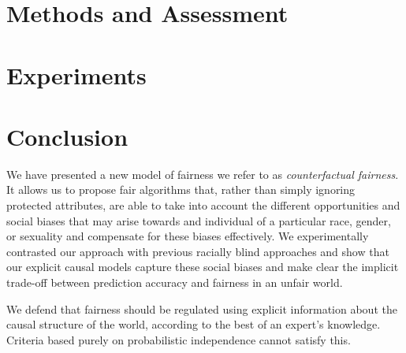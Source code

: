 \documentclass{article}
\begin{document}
\section{Methods and Assessment}
\label{sec:methods}


\section{Experiments}
\label{sec:experiments}


\section{Conclusion}
\label{sec:conclusion}
We have presented a new model of fairness we refer to as {\em
  counterfactual fairness}. It allows us to propose fair
algorithms that, rather than simply ignoring protected attributes, are
able to take into account the different opportunities and social biases
that may arise towards and individual of a particular race, gender, or
sexuality and compensate for these biases effectively. We
experimentally contrasted our approach with previous racially blind
approaches and show that our explicit causal models capture these
social biases and make clear the implicit trade-off between
prediction accuracy and fairness in an unfair world.

We defend that fairness should be regulated using explicit
information about the causal structure of the world, according to the
best of an expert's knowledge. Criteria based purely on probabilistic
independence cannot satisfy this.



\end{document}
